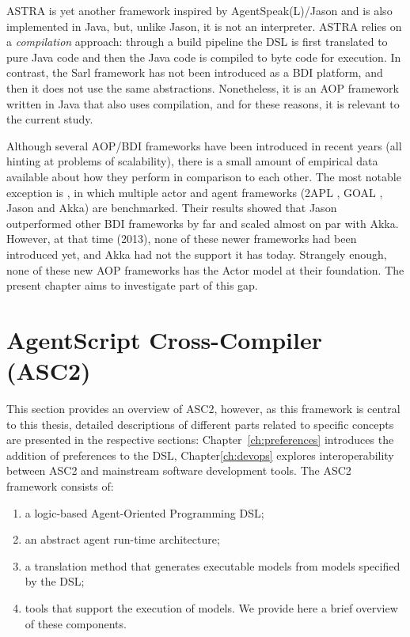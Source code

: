 ASTRA \cite{Astra} is yet another framework inspired by AgentSpeak(L)/Jason and is also implemented in Java, but, unlike Jason, it is not an interpreter. ASTRA relies on a \textit{compilation} approach: through a build pipeline the DSL is first translated to pure Java code and then the Java code is compiled to byte code for execution. In contrast, the Sarl \cite{Sarl} framework has not been introduced as a BDI platform, and then it does not use the same abstractions. Nonetheless, it is an AOP framework written in Java that also uses compilation, and for these reasons, it is relevant to the current study.


Although several AOP/BDI frameworks have been introduced in recent years (all hinting at problems of scalability), there is a small amount of empirical data available about how they perform in comparison to each other. The most notable exception is  \cite{Cardoso2013}, in which multiple actor and agent frameworks (2APL \cite{Dastani2APL}, GOAL \cite{Hindriks2009a}, Jason and Akka) are benchmarked. Their results showed that Jason outperformed other BDI frameworks by far and scaled almost on par with Akka. However, at that time (2013), none of these newer frameworks had been introduced yet, and Akka had not the support it has today. Strangely enough, none of these new AOP frameworks has the Actor model at their foundation. The present chapter aims to investigate part of this gap.


\section{AgentScript Cross-Compiler (ASC2)}
This section provides an overview of ASC2, however, as this framework is central to this thesis, detailed descriptions of different parts related to specific concepts are presented in the respective sections: Chapter~\ref{ch:preferences} introduces the addition of preferences to the DSL, Chapter\ref{ch:devops} explores interoperability between ASC2 and mainstream software development tools. The ASC2 framework consists of:
\begin{enumerate}[noitemsep]
    \item a logic-based Agent-Oriented Programming DSL;
    \item an abstract agent run-time architecture;
    \item a translation method that generates executable models from models specified by the DSL;
    \item tools that support the execution of models. We provide here a brief overview of these components.
\end{enumerate}

